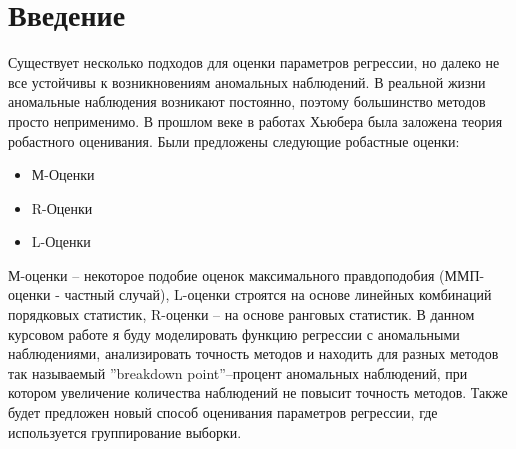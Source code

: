\documentclass[12pt]{article}
\begin{document}
\section{Введение}
Существует несколько подходов для оценки параметров регрессии, но далеко не все устойчивы к возникновениям аномальных наблюдений.
В реальной жизни аномальные наблюдения возникают постоянно, поэтому большинство методов просто неприменимо.
В прошлом веке в работах Хьюбера была заложена теория робастного оценивания.\hfill\break
Были предложены следующие робастные оценки\cite{Huber}:\hfill\break
\begin{itemize}
    \item М-Оценки\\
    \item R-Оценки\\
    \item L-Оценки
\end{itemize}
М-оценки -- некоторое подобие оценок максимального правдоподобия (ММП-оценки - частный случай), L-оценки строятся на основе линейных комбинаций порядковых статистик, R-оценки -- на основе ранговых статистик.
В данном курсовом работе я буду моделировать функцию регрессии с аномальными наблюдениями, анализировать точность методов и находить для разных методов так называемый ''breakdown point''--процент аномальных наблюдений, при котором увеличение количества наблюдений не повысит точность методов.\hfill\break
Также будет предложен новый способ оценивания параметров регрессии, где используется группирование выборки.

\newpage
\end{document}
